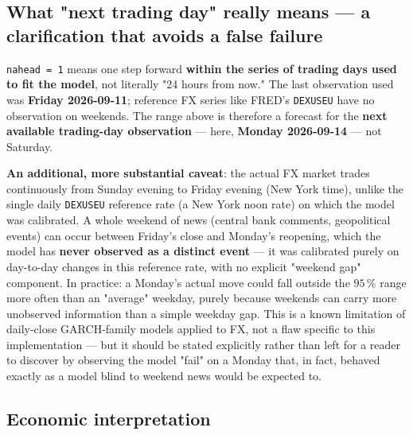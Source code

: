\documentclass[12pt,a4paper]{article}
\begin{document}
\newpage

\subsection{What "next trading day" really means --- a clarification that avoids a false failure}

\begin{limitbox}
	\texttt{nahead = 1} means one step forward \textbf{within the
		series of trading days used to fit the model}, not literally
	"24 hours from now." The last observation used was
	\textbf{Friday 2026-09-11}; reference FX series like
	FRED's \texttt{DEXUSEU} have no observation on
	weekends. The range above is therefore a forecast for the
	\textbf{next available trading-day observation} --- here,
	\textbf{Monday 2026-09-14} --- not Saturday.
	
	\textbf{An additional, more substantial caveat}: the actual FX
	market trades continuously from Sunday evening to Friday
	evening (New York time), unlike the single daily
	\texttt{DEXUSEU} reference rate (a New York noon rate) on
	which the model was calibrated. A whole weekend of news
	(central bank comments, geopolitical events) can occur between
	Friday's close and Monday's reopening, which the model has
	\textbf{never observed as a distinct event} --- it was
	calibrated purely on day-to-day changes in this
	reference rate, with no explicit "weekend gap"
	component. In practice: a Monday's actual move
	could fall outside the $95\,\%$ range more often than an
	"average" weekday, purely because weekends can carry
	more unobserved information than a simple weekday
	gap. This is a known limitation of daily-close
	GARCH-family models applied to FX, not a flaw specific
	to this implementation --- but it should be stated
	explicitly rather than left for a reader to discover by
	observing the model "fail" on a Monday that, in fact,
	behaved exactly as a model blind to weekend news
	would be expected to.
\end{limitbox}

\newpage

\subsection{Economic interpretation}
\end{document}
